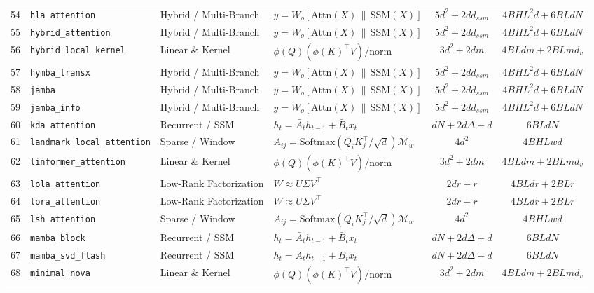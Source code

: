 \begin{center}
\begin{longtable}{rlllcc}
54 & \texttt{hla\_attention} & Hybrid / Multi-Branch & $y = W_o [\text{Attn}(X) \,\|\, \text{SSM}(X)]$ & $5 d^2 + 2 d d_{ssm}$ & $4 B H L^2 d + 6 B L d N$ \\
55 & \texttt{hybrid\_attention} & Hybrid / Multi-Branch & $y = W_o [\text{Attn}(X) \,\|\, \text{SSM}(X)]$ & $5 d^2 + 2 d d_{ssm}$ & $4 B H L^2 d + 6 B L d N$ \\
56 & \texttt{hybrid\_local\_kernel} & Linear \& Kernel & $\phi(Q)(\phi(K)^\top V) / \text{norm}$ & $3 d^2 + 2 d m$ & $4 B L d m + 2 B L m d_v$ \\
57 & \texttt{hymba\_transx} & Hybrid / Multi-Branch & $y = W_o [\text{Attn}(X) \,\|\, \text{SSM}(X)]$ & $5 d^2 + 2 d d_{ssm}$ & $4 B H L^2 d + 6 B L d N$ \\
58 & \texttt{jamba} & Hybrid / Multi-Branch & $y = W_o [\text{Attn}(X) \,\|\, \text{SSM}(X)]$ & $5 d^2 + 2 d d_{ssm}$ & $4 B H L^2 d + 6 B L d N$ \\
59 & \texttt{jamba\_info} & Hybrid / Multi-Branch & $y = W_o [\text{Attn}(X) \,\|\, \text{SSM}(X)]$ & $5 d^2 + 2 d d_{ssm}$ & $4 B H L^2 d + 6 B L d N$ \\
60 & \texttt{kda\_attention} & Recurrent / SSM & $h_t = \bar{A}_t h_{t-1} + \bar{B}_t x_t$ & $d N + 2 d \Delta + d$ & $6 B L d N$ \\
61 & \texttt{landmark\_local\_attention} & Sparse / Window & $A_{ij} = \text{Softmax}(Q_i K_j^\top / \sqrt{d}) \mathcal{M}_w$ & $4 d^2$ & $4 B H L w d$ \\
62 & \texttt{linformer\_attention} & Linear \& Kernel & $\phi(Q)(\phi(K)^\top V) / \text{norm}$ & $3 d^2 + 2 d m$ & $4 B L d m + 2 B L m d_v$ \\
63 & \texttt{lola\_attention} & Low-Rank Factorization & $W \approx U \Sigma V^\top$ & $2 d r + r$ & $4 B L d r + 2 B L r$ \\
64 & \texttt{lora\_attention} & Low-Rank Factorization & $W \approx U \Sigma V^\top$ & $2 d r + r$ & $4 B L d r + 2 B L r$ \\
65 & \texttt{lsh\_attention} & Sparse / Window & $A_{ij} = \text{Softmax}(Q_i K_j^\top / \sqrt{d}) \mathcal{M}_w$ & $4 d^2$ & $4 B H L w d$ \\
66 & \texttt{mamba\_block} & Recurrent / SSM & $h_t = \bar{A}_t h_{t-1} + \bar{B}_t x_t$ & $d N + 2 d \Delta + d$ & $6 B L d N$ \\
67 & \texttt{mamba\_svd\_flash} & Recurrent / SSM & $h_t = \bar{A}_t h_{t-1} + \bar{B}_t x_t$ & $d N + 2 d \Delta + d$ & $6 B L d N$ \\
68 & \texttt{minimal\_nova} & Linear \& Kernel & $\phi(Q)(\phi(K)^\top V) / \text{norm}$ & $3 d^2 + 2 d m$ & $4 B L d m + 2 B L m d_v$ \\

\end{longtable}
\end{center}
